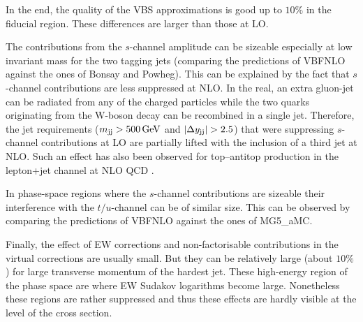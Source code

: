 In the end, the quality of the VBS approximations is good up to $10\%$ in the fiducial region.
These differences are larger than those at LO.

The contributions from the $s$-channel amplitude can be sizeable especially at low invariant mass for the two tagging jets (comparing the predictions of {\sc VBFNLO} against the ones of {\sc Bonsay} and {\sc Powheg}).
This can be explained by the fact that $s$-channel contributions are less suppressed at NLO.
In the real, an extra gluon-jet can be radiated from any of the charged particles while the two quarks originating from the W-boson decay can be recombined in a single jet.
Therefore, the jet requirements ($ m_{\text{j} \text{j}} >  500\,\text{GeV}$ and $|\Delta y_{\text{j} \text{j}}| > 2.5$) that were suppressing $s$-channel contributions at LO are partially lifted with the inclusion of a third jet at NLO.
Such an effect has also been observed for top--antitop production in the lepton+jet channel at NLO QCD \cite{Denner:2017kzu}.

In phase-space regions where the $s$-channel contributions are sizeable their interference with the $t/u$-channel can be of similar size.
This can be observed by comparing the predictions of {\sc VBFNLO} against the ones of {\sc MG5\_aMC}.

Finally, the effect of EW corrections and non-factorisable contributions in the virtual corrections are usually small.
But they can be relatively large (about $10\%$) for large transverse momentum of the hardest jet.
These high-energy region of the phase space are where EW Sudakov logarithms become large.
Nonetheless these regions are rather suppressed and thus these effects are hardly visible at the level of the cross section.
